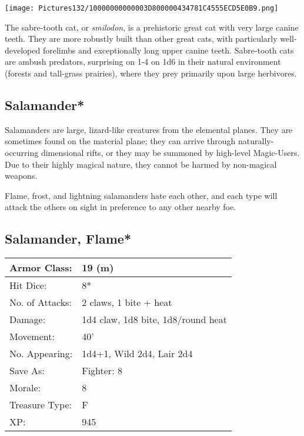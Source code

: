 \documentclass[a4paper,twoside,openany,10pt]{book}
\begin{document}
\begin{multicols}{2}
\begin{center} \texttt{[image: Pictures132/10000000000003D800000434781C4555ECD5E0B9.png]} \end{center}

The sabre-tooth cat, or \emph{smilodon}, is a prehistoric great cat with very large canine teeth. They are more robustly built than other great cats, with particularly well-developed forelimbs and exceptionally long upper canine teeth. Sabre-tooth cats are ambush predators, surprising on 1‑4 on 1d6 in their natural environment (forests and tall-grass prairies), where they prey primarily upon large herbivores.


\subsection*{Salamander*}\label{salamander}

Salamanders are large, lizard-like creatures from the elemental planes. They are sometimes found on the material plane; they can arrive through naturally-occurring dimensional rifts, or they may be summoned by high-level Magic-Users. Due to their highly magical nature, they cannot be harmed by non-magical weapons.

Flame, frost, and lightning salamanders hate each other, and each type will attack the others on sight in preference to any other nearby foe.

\subsection*{Salamander, Flame*}\label{salamander-flame}

\begin{tabularx}{0.50\textwidth}{@{}lX@{}}
Armor Class: & 19 (m) \\\hline
Hit Dice: & 8* \\\hline
No. of Attacks: & 2 claws, 1 bite + heat \\\hline
Damage: & 1d4 claw, 1d8 bite, 1d8/round heat \\\hline
Movement: & 40' \\\hline
No. Appearing: & 1d4+1, Wild 2d4, Lair 2d4 \\\hline
Save As: & Fighter: 8 \\\hline
Morale: & 8 \\\hline
Treasure Type: & F \\\hline
XP: & 945 \\\hline
\end{tabularx}\medskip



\end{multicols}
\end{document}
